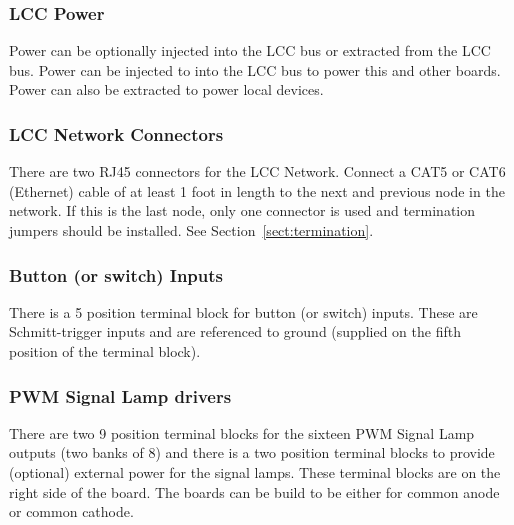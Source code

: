 \subsubsection{LCC Power}

Power can be optionally injected into the LCC bus or extracted from the LCC 
bus. Power can be injected to into the LCC bus to power this and other boards. 
Power can also be extracted to power local devices.

\subsubsection{LCC Network Connectors}

There are two RJ45 connectors for the LCC Network. Connect a CAT5 or CAT6
(Ethernet) cable of at least 1 foot in length to the next and previous node in
the network. If this is the last node, only one connector is used and
termination jumpers should be installed. See Section~\ref{sect:termination}.

\subsubsection{Button (or switch) Inputs}

There is a 5 position terminal block for button (or switch) inputs.  These are 
Schmitt-trigger inputs and are referenced to ground (supplied on the fifth 
position of the terminal block).

\subsubsection{PWM Signal Lamp drivers}

There are two 9 position terminal blocks for the sixteen PWM Signal Lamp 
outputs (two banks of 8) and there is a two position terminal blocks to 
provide (optional) external power for the signal lamps.  These terminal blocks 
are on the right side of the board.  The boards can be build to be either for 
common anode or common cathode.

\clearpage
